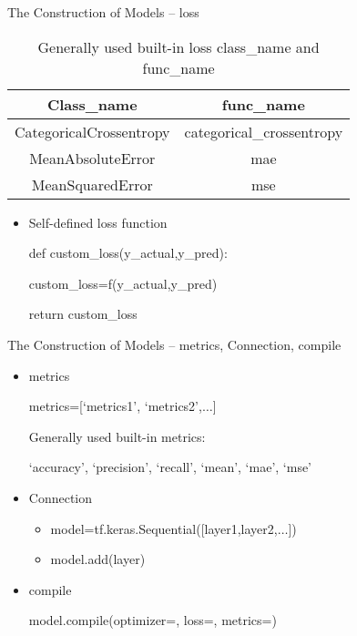 \documentclass{beamer}
\begin{document}
\begin{frame}{The Construction of Models -- loss}


\begin{table}
\centering
\begin{tabular}{|c|c|}
  \hline
  Class\_name & func\_name\\
  \hline
  \hline
  CategoricalCrossentropy & categorical\_crossentropy \\
  MeanAbsoluteError & mae \\
  MeanSquaredError & mse \\
  \hline
\end{tabular}
\caption{Generally used built-in loss class\_name and func\_name}
\end{table}
\begin{itemize}
  \item Self-defined loss function

  {\color{blue}
  def custom\_loss(y\_actual,y\_pred):

    \qquad custom\_loss=f(y\_actual,y\_pred)

    \qquad return custom\_loss}
\end{itemize}
\end{frame}

\begin{frame}{The Construction of Models -- metrics, Connection, compile}
\begin{itemize}
  \item metrics

  {\color{blue} metrics=[`metrics1', `metrics2',$\ldots$]}

  Generally used built-in metrics:

  `accuracy', `precision', `recall', `mean', `mae', `mse'
  \item Connection
  \begin{itemize}
    \item {\color{blue} model=tf.keras.Sequential([layer1,layer2,$\ldots$])}
    \item {\color{blue} model.add(layer)}
  \end{itemize}
  \item compile

  {\color{blue} model.compile(optimizer=, loss=, metrics=)}
\end{itemize}

\end{frame}
\end{document}
